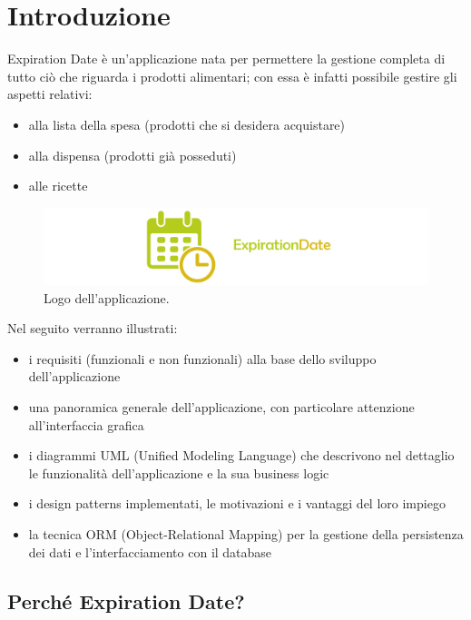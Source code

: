 \chapter{Introduzione}

Expiration Date è un'applicazione nata per permettere la gestione completa di tutto ciò che riguarda i prodotti alimentari; con essa è infatti possibile gestire gli aspetti relativi:
\begin{itemize}
  \item alla lista della spesa (prodotti che si desidera acquistare)
  \item alla dispensa (prodotti già posseduti)
  \item alle ricette
\end{itemize}

\begin{figure}[H]
  \includegraphics[width=\linewidth]{images/app-logo.png}
  \caption{Logo dell'applicazione.}
  \label{fig:applogo}
\end{figure}

Nel seguito verranno illustrati:
\begin{itemize}
\item i requisiti (funzionali e non funzionali) alla base dello sviluppo dell'applicazione
\item una panoramica generale dell'applicazione, con particolare attenzione all'interfaccia grafica
\item i diagrammi UML (Unified Modeling Language) che descrivono nel dettaglio le funzionalità dell'applicazione e la sua business logic
\item i design patterns implementati, le motivazioni e i vantaggi del loro impiego
\item la tecnica ORM (Object-Relational Mapping) per la gestione della persistenza dei dati e l'interfacciamento con il database
\end{itemize}

\section{Perché Expiration Date?}


